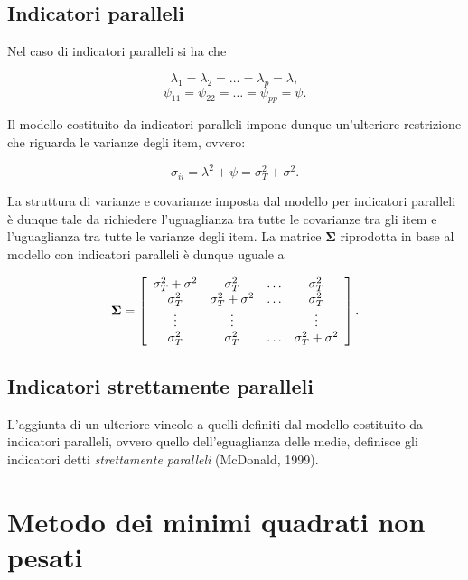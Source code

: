 \documentclass[
  11pt,
]{krantz}
\theoremstyle{definition}
\theoremstyle{definition}
\theoremstyle{definition}
\theoremstyle{definition}
\theoremstyle{remark}
\begin{document}
\hypertarget{indicatori-paralleli}{%
\subsection{Indicatori paralleli}\label{indicatori-paralleli}}

Nel caso di indicatori paralleli si ha che

\[
\lambda_1=\lambda_2=\dots=\lambda_p=\lambda,
\] \[
\psi_{11}=\psi_{22}=\dots=\psi_{pp}=\psi.
\]

Il modello costituito da indicatori paralleli impone dunque un'ulteriore restrizione che riguarda le varianze degli item, ovvero:

\[
\sigma_{ii} = \lambda^2 + \psi =\sigma^2_T + \sigma^2.
\]

La struttura di varianze e covarianze imposta dal modello per indicatori paralleli è dunque tale da richiedere l'uguaglianza tra tutte le covarianze tra gli item e l'uguaglianza tra tutte le varianze degli item. La matrice \(\boldsymbol{\Sigma}\) riprodotta in base al modello con indicatori paralleli è dunque uguale a

\[
\boldsymbol{\Sigma}=\left[
      \begin{array}{ c c c c }
        \sigma_{T}^2 + \sigma^2 & \sigma_{T}^2 & \dots & \sigma_{T}^2 \\
        \sigma_{T}^2 & \sigma_{T}^2 + \sigma^2 & \dots & \sigma_{T}^2 \\
        \vdots & \vdots & & \vdots\\
        \sigma_{T}^2 & \sigma_{T}^2 & \dots & \sigma_{T}^2 +\sigma^2 \notag
      \end{array} 
    \right].
\]

\hypertarget{indicatori-strettamente-paralleli}{%
\subsection{Indicatori strettamente paralleli}\label{indicatori-strettamente-paralleli}}

L'aggiunta di un ulteriore vincolo a quelli definiti dal modello costituito da indicatori paralleli, ovvero quello dell'eguaglianza delle medie, definisce gli indicatori detti \emph{strettamente paralleli} (McDonald, 1999).

\hypertarget{metodo-dei-minimi-quadrati-non-pesati}{%
\section{Metodo dei minimi quadrati non pesati}\label{metodo-dei-minimi-quadrati-non-pesati}}
\end{document}
